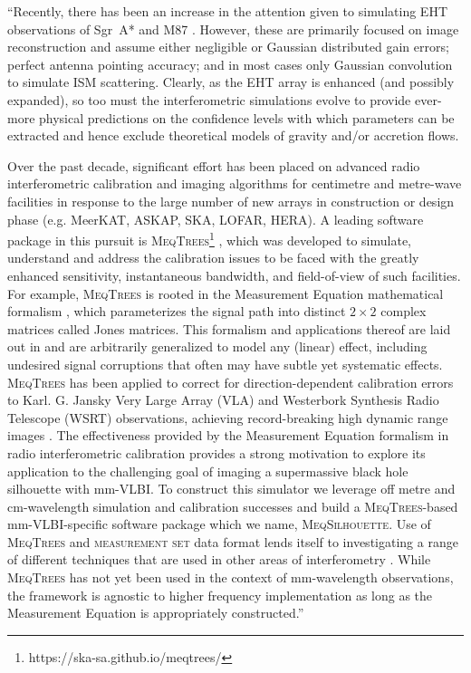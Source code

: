 {%
``Recently, there has been an increase in the attention given to simulating EHT observations of Sgr~A*  and M87 \citep{Fish_2014,Lu_2014,Bouman_2015,Lu_2016,Chael_2016}. However, these are primarily focused on image reconstruction and assume either negligible or Gaussian distributed gain errors; perfect antenna pointing accuracy; and in most cases only Gaussian convolution to simulate ISM scattering. Clearly, as the EHT array is enhanced (and possibly expanded), so too must the interferometric simulations evolve to provide ever-more physical predictions on the confidence levels with which parameters can be extracted and hence exclude theoretical models of gravity and/or accretion flows.


Over the past decade, significant effort has been placed on advanced radio interferometric calibration and imaging algorithms for centimetre and metre-wave facilities in response to the large number of new arrays in construction or design phase (e.g. MeerKAT, ASKAP, SKA, LOFAR, HERA). A leading software package in this pursuit is \textsc{MeqTrees}\footnote{https://ska-sa.github.io/meqtrees/} \citep*{Noordam_2010}, which was developed to simulate, understand and address the calibration issues to be faced with the greatly enhanced sensitivity, instantaneous bandwidth, and field-of-view of such facilities. For example, \textsc{MeqTrees} is rooted in the Measurement Equation mathematical formalism \citep{Hamaker_1996}, which parameterizes the signal path into distinct $2 \times 2$ complex  matrices called Jones matrices. This formalism and applications thereof are laid out in \citep{Smirnov_2011a,Smirnov_2011b,Smirnov_2011c} and are arbitrarily generalized to model any (linear) effect, including undesired signal corruptions that often may have subtle yet systematic effects. \textsc{MeqTrees} has been applied to correct for direction-dependent calibration errors to Karl. G. Jansky Very Large Array (VLA) and Westerbork Synthesis Radio Telescope (WSRT) observations, achieving record-breaking high dynamic range images \citep[][Makhathini et al, in prep.]{Smirnov_2011c}. The effectiveness provided by the Measurement Equation formalism in radio interferometric calibration provides a strong motivation to explore its application to the challenging goal of imaging a supermassive black hole silhouette with mm-VLBI. To construct this simulator we leverage off metre and cm-wavelength simulation and calibration successes and build a \textsc{MeqTrees}-based mm-VLBI-specific software package which we name, \textsc{MeqSilhouette}.  Use of \textsc{MeqTrees} and \textsc{measurement set} data format lends itself to investigating a range of different techniques that are used in other areas of interferometry \citep*[e.g.][]{Smirnov_2015}. While \textsc{MeqTrees} has not yet been used in the context of mm-wavelength observations, the framework is agnostic to higher frequency implementation as long as the Measurement Equation is appropriately constructed.'' \citep{Blecher_2016}


}
